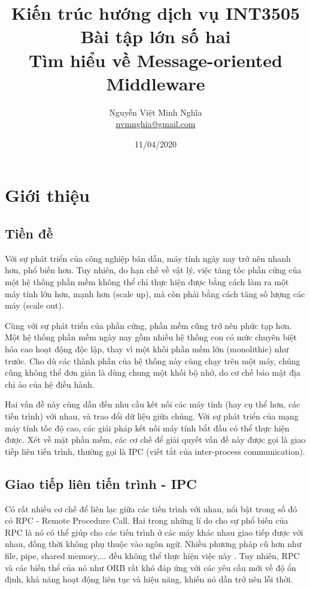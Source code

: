 \documentclass{article}
\author{Nguyễn Việt Minh Nghĩa \\ \href{mailto:nvmnghia@gmail.com}{nvmnghia@gmail.com}}
\date{11/04/2020}
\title{Kiến trúc hướng dịch vụ INT3505 \\ Bài tập lớn số hai \\ Tìm hiểu về Message-oriented Middleware}
\begin{document}
\maketitle

\section{Giới thiệu}

\subsection{Tiền đề}

Với sự phát triển của công nghiệp bán dẫn, máy tính ngày nay trở nên nhanh hơn,
phổ biến hơn. Tuy nhiên, do hạn chế về vật lý, việc tăng tốc phần cứng của một
hệ thống phần mềm không thể chỉ thực hiện được bằng cách làm ra một máy tính lớn
hơn, mạnh hơn (scale up), mà còn phải bằng cách tăng số lượng các máy (scale
out).

Cùng với sự phát triển của phần cứng, phần mềm cũng trở nên phức tạp hơn. Một hệ
thống phần mềm ngày nay gồm nhiều hệ thống con có mức chuyên biệt hóa cao hoạt
động độc lập, thay vì một khối phần mềm lớn (monolithic) như trước. Cho dù các
thành phần của hệ thống này cùng chạy trên một máy, chúng cũng không thể đơn
giản là dùng chung một khối bộ nhớ, do cơ chế bảo mật địa chỉ ảo của hệ điều
hành.

Hai vấn đề này cùng dẫn đến nhu cầu kết nối các máy tính (hay cụ thể hơn, các
tiến trình) với nhau, và trao đổi dữ liệu giữa chúng. Với sự phát triển của mạng
máy tính tốc độ cao, các giải pháp kết nối máy tính bắt đầu có thể thực hiện
được. Xét về mặt phần mềm, các cơ chế để giải quyết vấn đề này được gọi là giao
tiếp liên tiến trình, thường gọi là IPC (viết tắt của inter-process
communication).

\subsection{Giao tiếp liên tiến trình - IPC}

Có rất nhiều cơ chế để liên lạc giữa các tiến trình với nhau, nổi bật trong số
đó có RPC - Remote Procedure Call. Hai trong những lí do cho sự phổ biến của RPC
là nó có thể giúp cho các tiến trình ở các máy khác nhau giao tiếp được với
nhau, đồng thời không phụ thuộc vào ngôn ngữ. Nhiều phương pháp cũ hơn như file,
pipe, shared memory,... đều không thể thực hiện việc này \cite{osc12}. Tuy
nhiên, RPC và các biến thể của nó như ORB rất khó đáp ứng với các yêu cầu mới về
độ ổn định, khả năng hoạt động liên tục và hiệu năng, khiến nó dần trở nên lỗi
thời.
\end{document}
